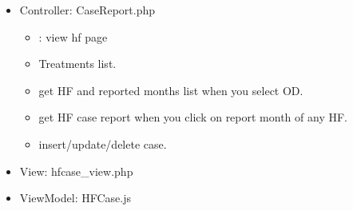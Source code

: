 \documentclass[letterpaper,10pt,english,openany,oneside]{sphinxmanual}
\begin{document}
\begin{itemize}
\item {} 
\sphinxAtStartPar
Controller: CaseReport.php
\begin{itemize}
\item {} 
\sphinxAtStartPar
{} : view hf page

\item {} 
\sphinxAtStartPar
{} Treatments list.

\item {} 
\sphinxAtStartPar
{} get HF and reported months list when you select OD.

\item {} 
\sphinxAtStartPar
{} get HF case report when you click on report month of any HF.

\item {} 
\sphinxAtStartPar
{} insert/update/delete case.

\end{itemize}

\begin{sphinxVerbatim}[commandchars=\\\{\}]
    
   
      
   
 
\end{sphinxVerbatim}

\item {} 
\sphinxAtStartPar
View: hfcase\_view.php

\item {} 
\sphinxAtStartPar
ViewModel: HFCase.js

\end{itemize}

\begin{sphinxVerbatim}[commandchars=\\\{\}]
  
  
    
    
  
  
     
     
\end{sphinxVerbatim}
\end{document}
